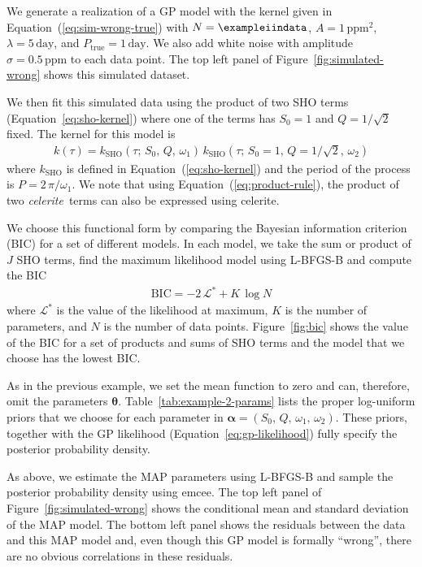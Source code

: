 \documentclass[manuscript, letterpaper]{aastex6}
\newcommand{\project}[1]{\textsf{#1}}
\newcommand{\celerite}{\project{celerite}}
\newcommand{\celeriteterm}{\emph{celerite}}
\newcommand{\emcee}{\project{emcee}}
\newcommand{\figureref}[1]{\ref{fig:#1}}
\newcommand{\Figure}[1]{Figure~\figureref{#1}}
\renewcommand{\eqref}[1]{\ref{eq:#1}}
\newcommand{\Eq}[1]{Equation~(\eqref{#1})}
\newcommand{\eq}[1]{\Eq{#1}}
\newcommand{\eqalt}[1]{Equation~\eqref{#1}}
\newcommand{\bvec}[1]{{\ensuremath{\boldsymbol{#1}}}}
\newcommand{\response}[1]{{\color{blue}#1}}
\begin{document}
\response{We generate a realization of a GP model with the kernel given in
\eq{sim-wrong-true} with $N = \exampleiindata$, $A = 1\,\mathrm{ppm}^2$,
$\lambda = 5\,\mathrm{day}$, and $P_\mathrm{true} = 1\,\mathrm{day}$.
We also add white noise with amplitude $\sigma = 0.5\,\mathrm{ppm}$ to each
data point.
The top left panel of \Figure{simulated-wrong} shows this simulated dataset.

We then fit this simulated data using the product of two SHO terms
(\eqalt{sho-kernel}) where one of the terms has $S_0 = 1$ and $Q =
1/\sqrt{2}$ fixed.
The kernel for this model is
\begin{eqnarray}
k(\tau) = k_\mathrm{SHO}(\tau;\,S_0,\,Q,\,\omega_1) \,
    k_\mathrm{SHO}(\tau;\,S_0 = 1,\,Q = 1/\sqrt{2},\,\omega_2)
\end{eqnarray}
where $k_\mathrm{SHO}$ is defined in \eq{sho-kernel} and the period of the
process is $P=2\,\pi/\omega_1$.
We note that using \eq{product-rule}, the product of two \celeriteterm\ terms
can also be expressed using \celerite.

We choose this functional form by comparing the Bayesian information criterion
(BIC) for a set of different models.
In each model, we take the sum or product of $J$ SHO terms, find the maximum
likelihood model using \project{L-BFGS-B} and compute the BIC
\citep{Schwarz:1978}
\begin{eqnarray}
\mathrm{BIC} = -2\,\mathcal{L}^* + K\,\log N
\end{eqnarray}
where $\mathcal{L}^*$ is the value of the likelihood at maximum, $K$ is the
number of parameters, and $N$ is the number of data points.
\Figure{bic} shows the value of the BIC for a set of products and sums of SHO
terms and the model that we choose has the lowest BIC.

As in the previous example, we set the mean function to zero and can,
therefore, omit the parameters $\bvec{\theta}$.
Table~\ref{tab:example-2-params} lists the proper log-uniform priors that we
choose for each parameter in $\bvec{\alpha} =
(S_0,\,Q,\,\omega_1,\,\omega_2)$.
These priors, together with the GP likelihood (\eqalt{gp-likelihood}) fully
specify the posterior probability density.

As above, we estimate the MAP parameters using \project{L-BFGS-B} and sample
the posterior probability density using \emcee.
The top left panel of \Figure{simulated-wrong} shows the conditional mean and
standard deviation of the MAP model.
The bottom left panel shows the residuals between the data and this MAP model
and, even though this GP model is formally ``wrong'', there are no obvious
correlations in these residuals.

}
\end{document}
